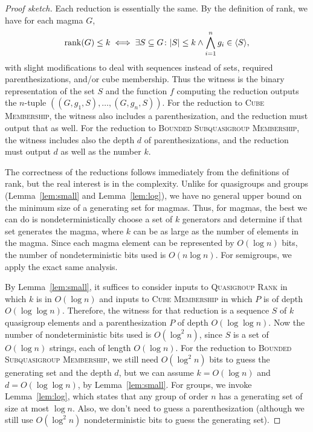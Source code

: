 \begin{proof}[Proof sketch]
  Each reduction is essentially the same.
  By the definition of rank, we have for each magma $G$,
  \begin{equation*}
    \operatorname{rank}(G) \leq k \iff \exists S \subseteq G \colon |S| \leq k \land \bigwedge_{i = 1}^n g_i \in \langle S \rangle,
  \end{equation*}
  with slight modifications to deal with sequences instead of sets, required parenthesizations, and/or cube membership.
  Thus the witness is the binary representation of the set $S$ and the function $f$ computing the reduction outputs the $n$-tuple $((G, g_1, S), \dotsc, (G, g_n, S))$.
  For the reduction to \textsc{Cube Membership}, the witness also includes a parenthesization, and the reduction must output that as well.
  For the reduction to \textsc{Bounded Subquasigroup Membership}, the witness includes also the depth $d$ of parenthesizations, and the reduction must output $d$ as well as the number $k$.

  The correctness of the reductions follows immediately from the definitions of rank, but the real interest is in the complexity.
  Unlike for quasigroups and groups (Lemma~\ref{lem:small} and Lemma~\ref{lem:log}), we have no general upper bound on the minimum size of a generating set for magmas.
  Thus, for magmas, the best we can do is nondeterministically choose a set of $k$ generators and determine if that set generates the magma, where $k$ can be as large as the number of elements in the magma.
  Since each magma element can be represented by $O(\log n)$ bits, the number of nondeterministic bits used is $O(n \log n)$.
  For semigroups, we apply the exact same analysis.

  By Lemma~\ref{lem:small}, it suffices to consider inputs to \textsc{Quasigroup Rank} in which $k$ is in $O(\log n)$ and inputs to \textsc{Cube Membership} in which $P$ is of depth $O(\log \log n)$.
  Therefore, the witness for that reduction is a sequence $S$ of $k$ quasigroup elements and a parenthesization $P$ of depth $O(\log \log n)$.
  Now the number of nondeterministic bits used is $O(\log^2 n)$, since $S$ is a set of $O(\log n)$ strings, each of length $O(\log n)$.
  For the reduction to \textsc{Bounded Subquasigroup Membership}, we still need $O(\log^2 n)$ bits to guess the generating set and the depth $d$, but we can assume $k = O(\log n)$ and $d = O(\log \log n)$, by Lemma~\ref{lem:small}.
  For groups, we invoke Lemma~\ref{lem:log}, which states that any group of order $n$ has a generating set of size at most $\log n$.
  Also, we don't need to guess a parenthesization (although we still use $O(\log^2 n)$ nondeterministic bits to guess the generating set).
\end{proof}

